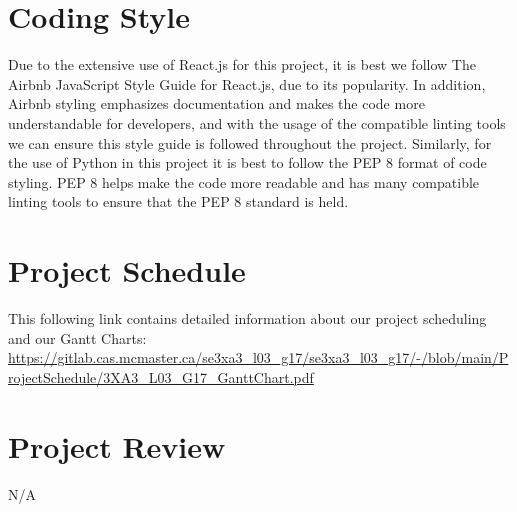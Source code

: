 \documentclass[12pt, titlepage]{article}
\begin{document}
\newpage
\section{Coding Style}
Due to the extensive use of React.js for this project, it is best we follow The Airbnb JavaScript Style Guide for React.js, due to its popularity. In addition, Airbnb styling emphasizes documentation and makes the code more understandable for developers, and with the usage of the compatible linting tools we can ensure this style guide is followed throughout the project. Similarly, for the use of Python in this project it is best to follow the PEP 8 format of code styling. PEP 8 helps make the code more readable and has many compatible linting tools to ensure that the PEP 8 standard is held. 

\section{Project Schedule}
This following link contains detailed information about our project scheduling and our Gantt Charts:\\
\url{https://gitlab.cas.mcmaster.ca/se3xa3_l03_g17/se3xa3_l03_g17/-/blob/main/ProjectSchedule/3XA3_L03_G17_GanttChart.pdf}

\section{Project Review}
N/A
\end{document}
